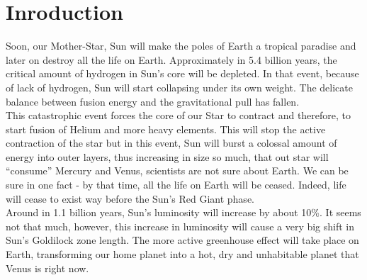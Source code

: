 \documentclass{article}
\begin{document}


  



\section{Inroduction}

Soon, our Mother-Star, Sun will make the poles of Earth a tropical paradise and later on destroy all the life on Earth. Approximately in 5.4 billion years, the critical amount of hydrogen in Sun's core will be depleted. In that event, because of lack of hydrogen, Sun will start collapsing under its own weight. The delicate balance between fusion energy and the gravitational pull has fallen.\\

This catastrophic event forces the core of our Star to contract and therefore, to start fusion of Helium and more heavy elements. This will stop the active contraction of the star but in this event, Sun will burst a colossal amount of energy into outer layers, thus increasing in size so much, that out star will ``consume'' Mercury and Venus, scientists are not sure about Earth. We can be sure in one fact -  by that time, all the life on Earth will be ceased. Indeed, life will cease to exist way before the Sun's Red Giant phase.\\

Around in 1.1 billion years, Sun's luminosity will increase by about 10\%. It seems not that much, however, this increase in luminosity will cause a very big shift in Sun's Goldilock zone length. The more active greenhouse effect will take place on Earth, transforming our home planet into a hot, dry and unhabitable planet that Venus is right now.~\cite{sun}\\
\end{document}
